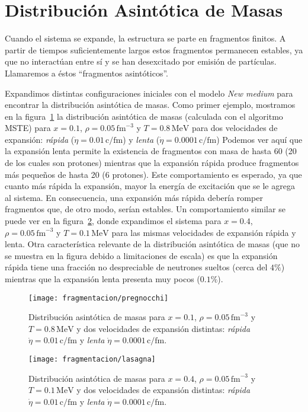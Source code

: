 \section{Distribución Asintótica de Masas}
Cuando el sistema se expande, la estructura se parte en fragmentos finitos.
A partir de tiempos suficientemente largos estos fragmentos permanecen estables, ya que no interactúan entre sí y se han desexcitado por emisión de partículas.
Llamaremos a éstos ``fragmentos asintóticos''.

Expandimos distintas configuraciones iniciales con el modelo \emph{New medium} para encontrar la distribución asintótica de masas.
Como primer ejemplo, mostramos en la figura~\ref{fig:asymp_preg} la distribución asintótica de masas (calculada con el algoritmo MSTE) para $x = 0.1$, $\rho = 0.05\,\text{fm}^{-3}$ y $T = 0.8\,\text{MeV}$ para dos velocidades de expansión: \emph{rápida} ($\dot{\eta} = 0.01\,\text{c/fm}$) y \emph{lenta} ($\dot{\eta} = 0.0001\,\text{c/fm}$)
Podemos ver aquí que la expansión lenta permite la existencia de fragmentos con masa de hasta 60 (20 de los cuales son protones) mientras que la expansión rápida produce fragmentos más pequeños de hasta 20 (6 protones).
Este comportamiento es esperado, ya que cuanto más rápida la expansión, mayor la energía de excitación que se le agrega al sistema.
En consecuencia, una expansión más rápida debería romper fragmentos que, de otro modo, serían estables.
Un comportamiento similar se puede ver en la figura~\ref{fig:asymp_las}, donde expandimos el sistema para $x = 0.4$, $\rho = 0.05\,\text{fm}^{-3}$ y $T = 0.1\,\text{MeV}$ para las mismas velocidades de expansión rápida y lenta.
Otra característica relevante de la distribución asintótica de masas (que no se muestra en la figura debido a limitaciones de escala) es que la expansión rápida tiene una fracción no despreciable de neutrones sueltos (cerca del $4\%$) mientras que la expansión lenta presenta muy pocos ($0.1\%$).

\begin{figure}[h]
  \centering
  \texttt{[image: fragmentacion/pregnocchi]}
  \caption{Distribución asintótica de masas para $x = 0.1$, $\rho = 0.05\,\text{fm}^{-3}$ y $T = 0.8\,\text{MeV}$ y dos velocidades de expansión distintas: \emph{rápida} $\dot{\eta} = 0.01\,\text{c/fm}$ y \emph{lenta} $\dot{\eta} = 0.0001\,\text{c/fm}$.}
\label{fig:asymp_preg}
\end{figure}

\begin{figure}[h]
  \centering
  \texttt{[image: fragmentacion/lasagna]}
  \caption{Distribución asintótica de masas para $x = 0.4$, $\rho = 0.05\,\text{fm}^{-3}$ y $T = 0.1\,\text{MeV}$ y dos velocidades de expansión distintas: \emph{rápida} $\dot{\eta} = 0.01\,\text{c/fm}$ y \emph{lenta} $\dot{\eta} = 0.0001\,\text{c/fm}$.}
\label{fig:asymp_las}
\end{figure}



